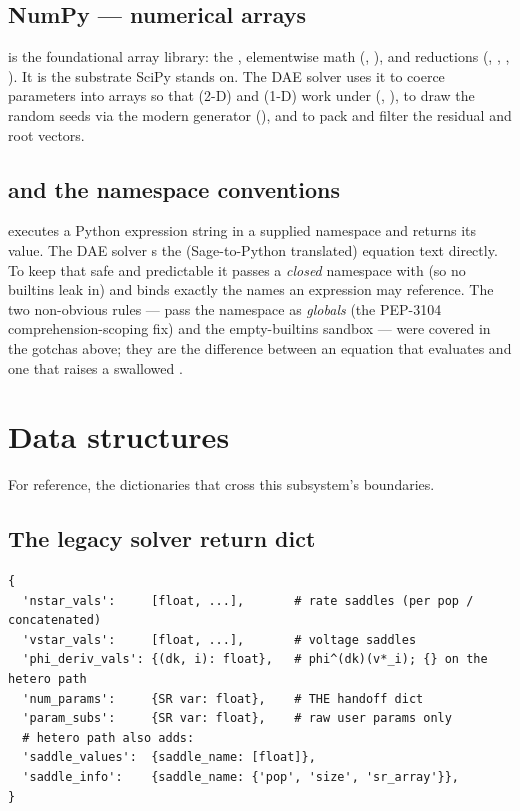 \subsection{NumPy --- numerical arrays}

 is the foundational array library: the , elementwise
math (, ), and reductions (, ,
, ). It is the substrate SciPy stands on. The DAE
solver uses it to coerce parameters into arrays so that  (2-D) and
 (1-D) work under  (,
), to draw the random seeds via the modern
generator  (), and to
pack and filter the residual and root vectors.

\subsection{ and the namespace conventions}

 executes a Python expression string in a
supplied namespace and returns its value. The DAE solver s the
(Sage-to-Python translated) equation text directly. To keep that safe and
predictable it passes a \emph{closed} namespace with
 (so no builtins leak in) and binds exactly the
names an expression may reference. The two non-obvious rules --- pass the namespace
as \emph{globals} (the PEP-3104 comprehension-scoping fix) and the empty-builtins
sandbox --- were covered in the gotchas above; they are the difference between an
equation that evaluates and one that raises a swallowed .

\section{Data structures}

For reference, the dictionaries that cross this subsystem's boundaries.

\subsection{The legacy solver return dict}

\begin{lstlisting}
{
  'nstar_vals':     [float, ...],       # rate saddles (per pop / concatenated)
  'vstar_vals':     [float, ...],       # voltage saddles
  'phi_deriv_vals': {(dk, i): float},   # phi^(dk)(v*_i); {} on the hetero path
  'num_params':     {SR var: float},    # THE handoff dict
  'param_subs':     {SR var: float},    # raw user params only
  # hetero path also adds:
  'saddle_values':  {saddle_name: [float]},
  'saddle_info':    {saddle_name: {'pop', 'size', 'sr_array'}},
}
\end{lstlisting}

